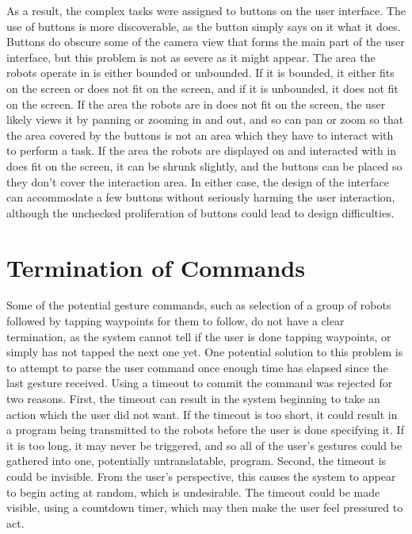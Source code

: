 As a result, the complex tasks were assigned to buttons on the user interface. 
The use of buttons is more discoverable, as the button simply says on it what it does. 
Buttons do obscure some of the camera view that forms the main part of the user interface, but this problem is not as severe as it might appear. 
The area the robots operate in is either bounded or unbounded.
If it is bounded, it either fits on the screen or does not fit on the screen, and if it is unbounded, it does not fit on the screen.
If the area the robots are in does not fit on the screen, the user likely views it by panning or zooming in and out, and so can pan or zoom so that the area covered by the buttons is not an area which they have to interact with to perform a task. 
If the area the robots are displayed on and interacted with in does fit on the screen, it can be shrunk slightly, and the buttons can be placed so they don't cover the interaction area. 
In either case, the design of the interface can accommodate a few buttons without seriously harming the user interaction, although the unchecked proliferation of buttons could lead to design difficulties. 

\section{Termination of Commands}

Some of the potential gesture commands, such as selection of a group of robots followed by tapping waypoints for them to follow, do not have a clear termination, as the system cannot tell if the user is done tapping waypoints, or simply has not tapped the next one yet. 
One potential solution to this problem is to attempt to parse the user command once enough time has elapsed since the last gesture received. 
Using a timeout to commit the command was rejected for two reasons. 
First, the timeout can result in the system beginning to take an action which the user did not want. If the timeout is too short, it could result in a program being transmitted to the robots before the user is done specifying it. 
If it is too long, it may never be triggered, and so all of the user's gestures could be gathered into one, potentially untranslatable, program. 
Second, the timeout is could be invisible. From the user's perspective, this causes the system to appear to begin acting at random, which is undesirable. 
The timeout could be made visible, using a countdown timer, which may then make the user feel pressured to act. 

